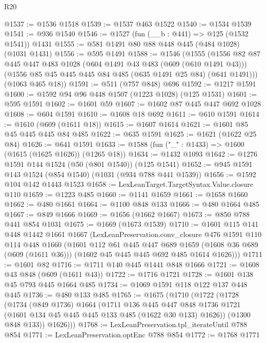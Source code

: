 \begin{lexlean}{R20}
\begin{coremodule}
@1537 := @1536 @1518
@1539 := @1537 @463 @1522
@1540 := @1534 @1539
@1541 := @936 @1540
@1546 := @1527 (fun (__b : @441) => @125 (@1532 @1541)) @1431
@1555 := @581 @1491 @80 @88 @448 @445 (@484 @1028) (@1031 @1431)
@1556 := @595 @1491
@1588 := @1546
    (@1555
      (@1556
        @82
        @87
        @445
        @447
        @483
        @1028
        (@604 @1491 @43 @483 (@609 (@610 @1491 @43)))
        (@1556 @85 @45 @445 @445 @84 @485 (@635 @1491 @25 @84) (@641 @1491)))
      (@1063 @465 @18))
@1591 := @511 (@757 @848) @696
@1592 := @1217 @1591
@1600 := @1592 @94 @96 @448 @1507 (@1223 @1028) (@125 @1531)
@1601 := @595 @1591
@1602 := @1601 @59
@1607 := @1602 @87 @445 @447 @692 @1028
@1608 := @604 @1591
@1610 := @1608 @18 @692
@1611 := @610 @1591
@1614 := @1610 (@609 (@1611 @18))
@1615 := @1607 @1614
@1621 := @1601 @85 @45 @445 @445 @84 @485
@1622 := @635 @1591
@1625 := @1621 (@1622 @25 @84)
@1626 := @641 @1591
@1633 := @1588 (fun ("_" : @1433) => @1600 (@1615 (@1625 @1626)) (@1265 @18))
@1634 := @1432 @1093
@1642 := @1276 @1591 @144 @1524 (@50 (@801 @1540)) (@125 @1541)
@1652 := @945 @1591 @143 @1524 (@854 @1540) (@1031 (@934 @788 @441 @1539))
@1656 := @1592 @104 @142 @1443 @1523
@1658 := LexLeanTarget.TargetSyntax.Value.closure @110
@1659 := @1223 @485
@1660 := @1141 @1659
@1661 := @1658 @1660
@1662 := @480 @1661
@1664 := @1100 @848 @133
@1666 := @480 @1664 @485
@1667 := @849 @1666
@1669 := @1656 (@1662 @1667)
@1673 := @850 @788 @441 @854 @1031
@1675 := @1669 (@1673 @1539)
@1710 := @1601
    @115
    @141
    @448
    @1442
    @1661
    @1667
    (LexLeanPreservation.conv_closure
      @476
      @1591
      @110
      @114
      @448
      @1660
      (@1601
        @112
        @61
        @445
        @447
        @689
        @1659
        (@1608 @36 @689 (@609 (@1611 @36)))
        (@1602 @45 @445 @445 @692 @485 @1614 @1626)))
@1711 := @1601 @82
@1716 := @1711 @140 @445 @1441 @848 @1666
@1721 := @1608 @43 @848 (@609 (@1611 @43))
@1722 := @1716 @1721
@1728 := @1601 @138 @45 @793 @445 @1664 @485
@1734 := @1069 @1591 @118 @122 @137 @448 @445
@1736 := @480 @133 @485
@1765 := @1675
    (@1710
      (@1722
        (@1728
          (@1734
            (@849 @1736)
            @1664
            (@1711
              @136
              @445
              @447
              @848
              @1736
              @1721
              (@1601 @134 @45 @445 @445 @133 @485 (@1622 @30 @133) @1626))
            (@1300 @848 @133))
          @1626)))
@1768 := LexLeanPreservation.tpl_iterateUntil @788 @854
@1771 := LexLeanPreservation.optEnc @788 @854
@1772 := @1768 @1771

\end{coremodule}
\end{lexlean}
